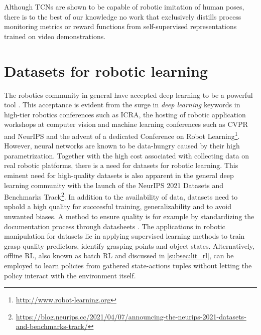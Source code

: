 \documentclass[\home/main.tex]{subfiles}
\begin{document}
Although \glspl{TCN} are shown to be capable of robotic imitation of human poses, there is to the best of our knowledge no work that exclusively distills process monitoring metrics or reward functions from self-supervised representations trained on video demonstrations. %

\section{Datasets for robotic learning} \label{sec:lit_datasets}
The robotics community in general have accepted deep learning to be a powerful tool \autocite{Sunderhauf2018}. This acceptance is evident from the surge in \textit{deep learning} keywords in high-tier robotics conferences such as ICRA, the hosting of robotic application workshops at computer vision and machine learning conferences such as CVPR \autocite{angelova2017computer} and NeurIPS \autocite{Posner2017} and the advent of a dedicated Conference on Robot Learning\footnote{\url{http://www.robot-learning.org}}. However, neural networks are known to be data-hungry caused by their high parametrization. Together with the high cost associated with collecting data on real robotic platforms, there is a need for datasets for robotic learning. This eminent need for high-quality datasets is also apparent in the general deep learning community with the launch of the NeurIPS 2021 Datasets and Benchmarks Track\footnote{\url{https://blog.neurips.cc/2021/04/07/announcing-the-neurips-2021-datasets-and-benchmarks-track/}}. In addition to the availability of data, datasets need to uphold a high quality for succcesful training, generalizability and to avoid unwanted biases. A method to ensure quality is for example by standardizing the documentation process through datasheets \autocite{gebru2018datasheets}.
The applications in robotic manipulation for datasets lie in applying supervised learning methods to train grasp quality predictors, identify grasping points and object states. Alternatively, offline RL, also known as batch RL and discussed in \cref{subsec:lit_rl}, can be employed to learn policies from gathered state-actions tuples without letting the policy interact with the environment itself.
\end{document}
